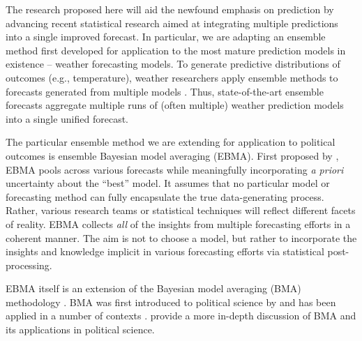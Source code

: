 \documentclass[pdftex,12pt,fullpage,oneside]{amsart}
\begin{document}
The research proposed here will aid the newfound emphasis on
prediction by advancing recent statistical research aimed at
integrating multiple predictions into a single improved forecast.  In particular,
we are adapting an ensemble method first developed for application to
the most mature prediction models in existence -- weather forecasting
models.  To generate predictive distributions of outcomes (e.g.,
temperature), weather researchers apply ensemble methods to forecasts
generated from multiple models \citep{Raftery:2005}.  Thus,
state-of-the-art ensemble forecasts aggregate multiple runs of (often
multiple) weather prediction models into a single unified forecast.

The particular ensemble method we are extending for application to
political outcomes is ensemble Bayesian model averaging (EBMA). First
proposed by \citet{Raftery:2005}, EBMA pools across various forecasts
while meaningfully incorporating \textit{a priori} uncertainty about
the ``best'' model.  It assumes that no particular model or
forecasting method can fully encapsulate the true data-generating
process.  Rather, various research teams or statistical techniques
will reflect different facets of reality. EBMA collects \textit{all}
of the insights from multiple forecasting efforts in a coherent
manner.  The aim is not to choose a model, but rather to incorporate
the insights and knowledge implicit in various forecasting efforts via
statistical post-processing.

EBMA itself is an extension of the Bayesian model averaging (BMA)
methodology \citep[c.f.,][]{Madigan:1994, Draper:1995, Raftery:1995,
  Hoeting:1999, Clyde:2003, Raftery:2003, Clyde:2004}.  BMA was first
introduced to political science by \citet{Bartels:1997} and has been
applied in a number of contexts \citep[e.g.,][]{Bartels:2001,
  Gill:2004, Imai:2004, Geer:2006b}. \citet{Montgomery:2010c} provide
a more in-depth discussion of BMA and its applications in political
science.
\end{document}
